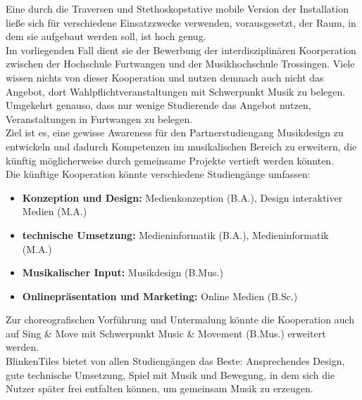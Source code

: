 
Eine durch die Traversen und Stethoskopstative mobile Version der Installation ließe sich für verschiedene Einsatzzwecke verwenden, vorausgesetzt, der Raum, in dem sie aufgebaut werden soll, ist hoch genug.\\
Im vorliegenden Fall dient sie der Bewerbung der interdisziplinären Koorperation zwischen der Hochschule Furtwangen und der Musikhochschule Trossingen. Viele wissen nichts von dieser Kooperation und nutzen demnach auch nicht das Angebot, dort Wahlpflichtveranstaltungen mit Schwerpunkt Musik zu belegen. Umgekehrt genauso, dass nur wenige Studierende das Angebot nutzen, Veranstaltungen in Furtwangen zu belegen.\\
Ziel ist es, eine gewisse Awareness für den Partnerstudiengang Musikdesign zu entwickeln und dadurch Kompetenzen im musikalischen Bereich zu erweitern, die künftig möglicherweise durch gemeinsame Projekte vertieft werden könnten.\\

Die künftige Kooperation könnte verschiedene Studiengänge umfassen:
\begin{itemize}
	\item \textbf{Konzeption und Design:} Medienkonzeption (B.A.), Design interaktiver Medien (M.A.)
	\item \textbf{technische Umsetzung:} Medieninformatik (B.A.), Medieninformatik (M.A.)
	\item \textbf{Musikalischer Input:} Musikdesign (B.Mus.)
	\item \textbf{Onlinepräsentation und Marketing:} Online Medien (B.Sc.)
\end{itemize}

Zur choreografischen Vorführung und Untermalung könnte die Kooperation auch auf Sing \& Move mit Schwerpunkt Music \& Movement (B.Mus.) erweitert werden.\\

BlinkenTiles bietet von allen Studiengängen das Beste: Ansprechendes Design, gute technische Umsetzung, Spiel mit Musik und Bewegung, in dem sich die Nutzer später frei entfalten können, um gemeinsam Musik zu erzeugen.










